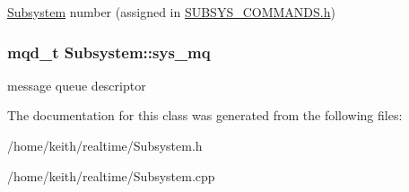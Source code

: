 \hyperlink{classSubsystem}{Subsystem} number (assigned in \hyperlink{SUBSYS__COMMANDS_8h}{S\-U\-B\-S\-Y\-S\-\_\-\-C\-O\-M\-M\-A\-N\-D\-S.\-h}) \hypertarget{classSubsystem_a3ef2ff7ded6b1623fae096828d549369}{
\subsubsection[{sys\-\_\-mq}]{\setlength{\rightskip}{0pt plus 5cm}mqd\-\_\-t Subsystem\-::sys\-\_\-mq\hspace{0.3cm}{\ttfamily [protected]}}}\label{classSubsystem_a3ef2ff7ded6b1623fae096828d549369}
message queue descriptor 

The documentation for this class was generated from the following files\-:\begin{DoxyCompactItemize}
\item 
/home/keith/realtime/Subsystem.\-h\item 
/home/keith/realtime/Subsystem.\-cpp\end{DoxyCompactItemize}
